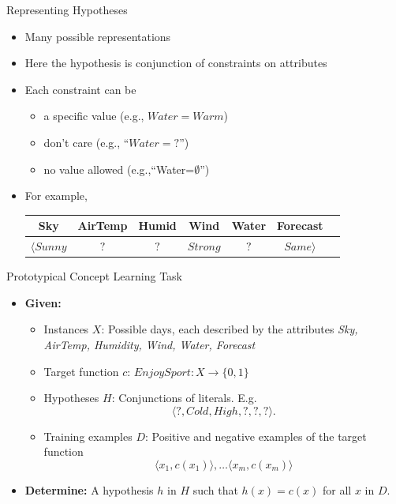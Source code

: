 \documentclass[%
pdf,
colorBG,
slideColor,
tcrico,
]{prosper}
\begin{document}



\begin{slide}{Representing Hypotheses}
\begin{itemize}
\item Many possible representations
\item Here the hypothesis is conjunction of constraints on attributes
\item Each constraint can be
	\begin{itemize}
	\item a specific value (e.g., $Water=Warm$)
	\item don't care (e.g., ``$Water=?$'')
	\item no value allowed (e.g.,``Water=$\emptyset$'') 
	\end{itemize}
\item For example,
	\tiny
	\begin{tabular}{ccccccc} 
	\rowcolor[HTML]{bbccdd} Sky & AirTemp & Humid & Wind & Water & Forecast 
 	\\ \hline \hline
	\rowcolor[HTML]{bbccdd} $\langle Sunny$   & $?$    & $?$ & $Strong$  & $?$    & $Same \rangle$
	\end{tabular}
\end{itemize}
\end{slide}



\begin{slide}{Prototypical Concept Learning Task}
\tiny
\begin{itemize}
 \item  {\bf Given:} 
	\begin{itemize}
	\item Instances $X$: Possible days, each described by the attributes {\em Sky, AirTemp, Humidity, Wind, Water, Forecast}
	\item Target function $c$: $EnjoySport: X \rightarrow \{0,1 \}$
	\item Hypotheses $H$: Conjunctions of literals. E.g. \[\langle ?, Cold, High, ?, ?, ? \rangle. \]
	\item Training examples $D$: Positive and negative examples of the target function \[\langle x_1, c(x_1) \rangle , \ldots \langle x_m, c(x_m) \rangle\]
	\end{itemize}
\item {\bf Determine:}
A hypothesis $h$ in $H$ such that $h(x)=c(x)$ for all $x$ in $D$.
%
\end{itemize}

\end{slide}
\end{document}
